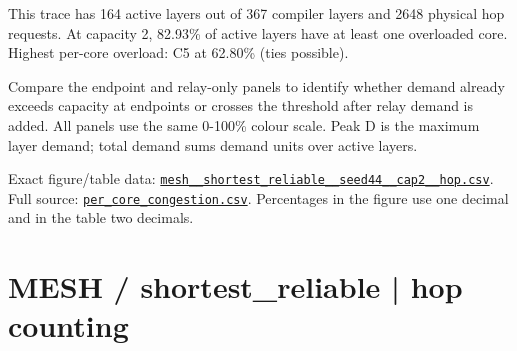 \documentclass[10pt,a4paper]{article}
\begin{document}
This trace has 164 active layers out of 367 compiler layers and 2648 physical hop requests. At capacity 2, 82.93\% of active layers have at least one overloaded core. Highest per-core overload: C5 at 62.80\% (ties possible).\par
Compare the endpoint and relay-only panels to identify whether demand already exceeds capacity at endpoints or crosses the threshold after relay demand is added. All panels use the same 0-100\% colour scale. Peak D is the maximum layer demand; total demand sums demand units over active layers.\par
Exact figure/table data: \href{\detokenize{file:///home/dhruv-pansuriya/Documents/BTP/Compiler-Driven-ACE/output/pdf/qaoa_methods_congestion/tables/mesh__shortest_reliable__seed44__cap2__hop.csv}}{\nolinkurl{mesh__shortest_reliable__seed44__cap2__hop.csv}}. Full source: \href{\detokenize{file:///home/dhruv-pansuriya/Documents/BTP/Compiler-Driven-ACE/results/qaoa_2seed_2026-10-26/congestion/per_core_congestion.csv}}{\nolinkurl{per_core_congestion.csv}}. Percentages in the figure use one decimal and in the table two decimals.\par
\clearpage
\section*{MESH / shortest\_reliable | hop counting}
\end{document}

